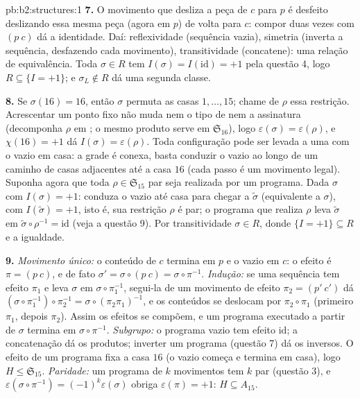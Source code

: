 \begin{solution}{pb:b2:structures:1}
\textbf{7.} O movimento que desliza a peça de $c$ para $p$ é desfeito
deslizando essa mesma peça (agora em $p$) de volta para $c$: compor
duas vezes com $(p\ c)$ dá a identidade. Daí: reflexividade (sequência
vazia), simetria (inverta a sequência, desfazendo cada movimento),
transitividade (concatene): uma relação de equivalência. Toda
$\sigma \in R$ tem $I(\sigma) = I(\mathrm{id}) = +1$ pela questão
4, logo $R \subseteq \{I = +1\}$; e $\sigma_L \notin R$ dá uma
segunda classe.

\textbf{8.} Se $\sigma(16) = 16$, então $\sigma$ permuta as
casas $1, \dots, 15$; chame de $\rho$ essa restrição. Acrescentar
um ponto fixo não muda nem o tipo de  nem a assinatura
(decomponha $\rho$ em ; o mesmo produto serve em
$\mathfrak{S}_{16}$), logo $\varepsilon(\sigma) =
\varepsilon(\rho)$, e $\chi(16) = +1$ dá $I(\sigma) =
\varepsilon(\rho)$. Toda configuração pode ser levada a uma
com o vazio em casa: a grade é conexa, basta conduzir o vazio ao longo de um
caminho de casas adjacentes até a casa $16$ (cada passo é um movimento legal).
Suponha agora que toda $\rho \in \mathfrak{S}_{15}$ par seja realizada
por um programa. Dada $\sigma$ com $I(\sigma) = +1$: conduza o
vazio até casa para chegar a $\widetilde\sigma$ (equivalente a $\sigma$),
com $I(\widetilde\sigma) = +1$, isto é, sua restrição $\rho$ é
par; o programa que realiza $\rho$ leva $\widetilde\sigma$ em
$\widetilde\sigma \circ \rho^{-1} = \mathrm{id}$ (veja a questão
9). Por transitividade $\sigma \in R$, donde $\{I = +1\} \subseteq
R$ e a igualdade.

\textbf{9.} \emph{Movimento único:} o conteúdo de $c$ termina em $p$
e o vazio em $c$: o efeito é $\pi = (p\ c)$, e de fato
$\sigma' = \sigma \circ (p\ c) = \sigma \circ \pi^{-1}$.
\emph{Indução:} se uma sequência tem efeito $\pi_1$ e leva
$\sigma$ em $\sigma \circ \pi_1^{-1}$, segui-la de um movimento
de efeito $\pi_2 = (p'\ c')$ dá $(\sigma \circ \pi_1^{-1})
\circ \pi_2^{-1} = \sigma \circ (\pi_2\pi_1)^{-1}$, e os conteúdos
se deslocam por $\pi_2 \circ \pi_1$ (primeiro $\pi_1$, depois $\pi_2$). Assim
os efeitos se compõem, e um programa executado a partir de $\sigma$ termina em $\sigma
\circ \pi^{-1}$. \emph{Subgrupo:} o programa vazio tem efeito
$\mathrm{id}$; a concatenação dá os produtos; inverter um programa
(questão 7) dá os inversos. O efeito de um programa fixa a casa $16$
(o vazio começa e termina em casa), logo $H \leq \mathfrak{S}_{15}$.
\emph{Paridade:} um programa de $k$ movimentos tem $k$ par (questão
3), e $\varepsilon(\sigma \circ \pi^{-1}) =
(-1)^k\varepsilon(\sigma)$ obriga $\varepsilon(\pi) = +1$: $H
\subseteq A_{15}$.


\end{solution}
